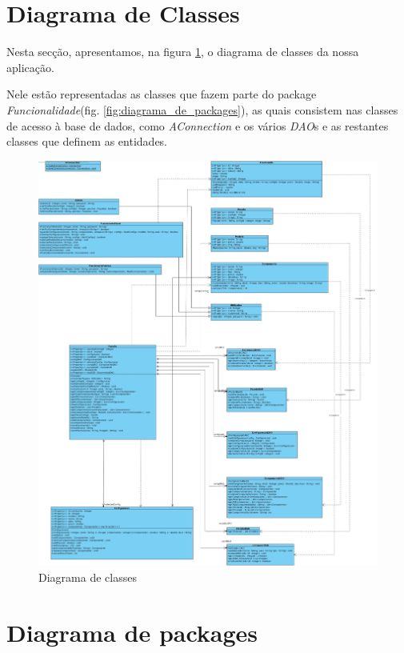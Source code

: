 \section{Diagrama de Classes}

Nesta secção, apresentamos, na figura \ref{fig:diagrama_de_classes}, o diagrama de classes da nossa aplicação.


Nele estão representadas as classes que fazem parte do package \emph{Funcionalidade}(fig. \ref{fig:diagrama_de_packages}), as quais consistem nas classes de acesso à base de dados, como \emph{AConnection} e os vários \emph{DAO}s e as restantes classes que definem as entidades.


\begin{figure}[h]
    \centering
    \includegraphics[width=\textwidth]{diagrama_de_classes/diagrama_de_classes.jpg}
    \caption{Diagrama de classes}
    \label{fig:diagrama_de_classes}
\end{figure}

\section{Diagrama de packages}


